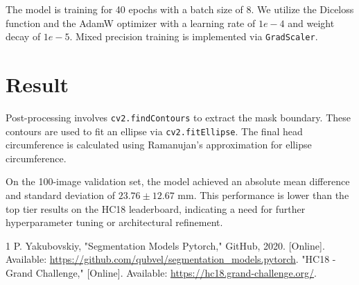 \documentclass[conference]{IEEEtran} \usepackage{url}
\begin{document}
The model is training for 40 epochs with a batch size of 8. We utilize the
Diceloss function and the AdamW optimizer with a learning rate of $1e-4$
and weight decay of $1e-5$. Mixed precision training is implemented via
\texttt{GradScaler}.

\section{Result}

Post-processing involves \texttt{cv2.findContours} to extract the mask boundary.
These contours are used to fit an ellipse via \texttt{cv2.fitEllipse}. The final
head circumference is calculated using Ramanujan's approximation for ellipse
circumference.

On the 100-image validation set, the model achieved an absolute mean difference
and standard deviation of $23.76 \pm 12.67$ mm. This performance is lower than
the top tier results on the HC18 leaderboard, indicating a need for further
hyperparameter tuning or architectural refinement.

\begin{thebibliography}{1}
P. Yakubovskiy, "Segmentation Models Pytorch," GitHub, 2020. [Online]. Available: \url{https://github.com/qubvel/segmentation_models.pytorch}.
"HC18 - Grand Challenge," [Online]. Available: \url{https://hc18.grand-challenge.org/}.
\end{thebibliography}
\end{document}
